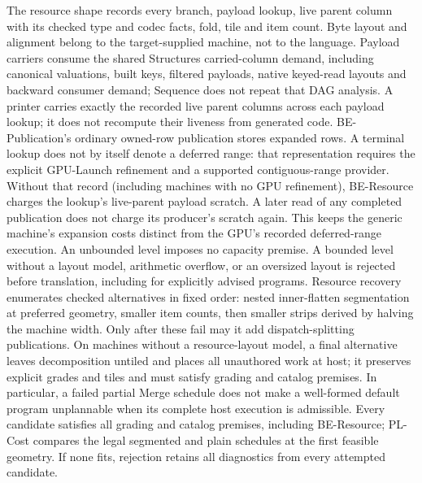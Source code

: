 The resource shape records every branch, payload lookup, live parent column
with its checked type and codec facts, fold, tile and item count. Byte layout
and alignment belong to the target-supplied machine, not to the language.
Payload carriers consume the shared Structures carried-column demand, including
canonical valuations, built keys, filtered payloads, native keyed-read layouts
and backward consumer demand; Sequence does not repeat that DAG analysis.
A printer carries exactly the recorded live parent columns across each payload
lookup; it does not recompute their liveness from generated code.
BE-Publication's ordinary owned-row publication stores expanded rows.
A terminal lookup does not by itself denote a deferred range: that
representation requires the explicit GPU-Launch refinement and a supported
contiguous-range provider. Without that record (including machines with no
GPU refinement), BE-Resource charges the lookup's live-parent payload scratch.
A later read of any completed publication does not charge its producer's
scratch again. This keeps the generic machine's expansion costs distinct
from the GPU's recorded deferred-range execution.
An unbounded level imposes no capacity premise. A bounded level without a
layout model, arithmetic overflow, or an oversized layout is rejected before
translation, including for explicitly advised programs. Resource recovery
enumerates checked alternatives in fixed order: nested inner-flatten
segmentation at preferred geometry, smaller item counts, then smaller strips
derived by halving the machine width. Only after these fail may it add
dispatch-splitting publications. On machines without a resource-layout model,
a final alternative leaves decomposition untiled and places all unauthored
work at host; it preserves explicit grades and tiles and must satisfy grading and catalog
premises. In particular, a failed partial Merge schedule does not make a
well-formed default program unplannable when its complete host execution is
admissible. Every candidate satisfies all grading and catalog premises,
including BE-Resource; PL-Cost compares the legal segmented and plain
schedules at the first feasible geometry. If none fits, rejection retains
all diagnostics from every attempted candidate.

